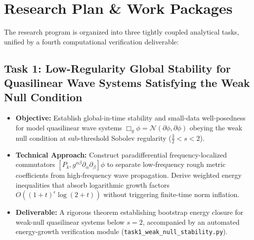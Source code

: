 \documentclass[11pt, a4paper]{article}
\begin{document}
\section{Research Plan \& Work Packages}

The research program is organized into three tightly coupled analytical tasks, unified by a fourth computational verification deliverable:

\subsection*{Task 1: Low-Regularity Global Stability for Quasilinear Wave Systems Satisfying the Weak Null Condition}
\begin{itemize}
    \item \textbf{Objective:} Establish global-in-time stability and small-data well-posedness for model quasilinear wave systems $\Box_g \phi = \mathcal{N}(\partial\phi, \partial\phi)$ obeying the weak null condition at sub-threshold Sobolev regularity ($\frac{3}{2} < s < 2$).
    \item \textbf{Technical Approach:} Construct paradifferential frequency-localized commutators $[P_k, g^{\alpha\beta}\partial_\alpha\partial_\beta]\phi$ to separate low-frequency rough metric coefficients from high-frequency wave propagation. Derive weighted energy inequalities that absorb logarithmic growth factors $O((1+t)^\epsilon \log(2+t))$ without triggering finite-time norm inflation.
    \item \textbf{Deliverable:} A rigorous theorem establishing bootstrap energy closure for weak-null quasilinear systems below $s = 2$, accompanied by an automated energy-growth verification module (\texttt{task1\_weak\_null\_stability.py}).
\end{itemize}
\end{document}

